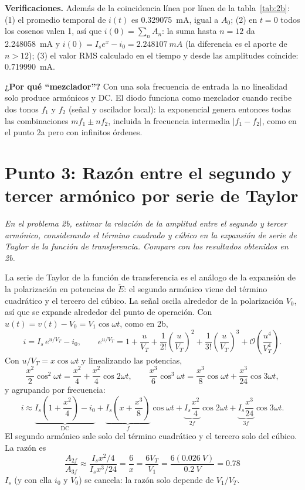 \documentclass{article}
\newcommand{\VT}{V_T}
\begin{document}
\textbf{Verificaciones.} Además de la coincidencia línea por línea de la tabla~\ref{tab:2b}:
(1) el promedio temporal de $i(t)$ es \SI{0.329075}{mA}, igual a $A_0$; (2) en $t=0$ todos los
cosenos valen 1, así que $i(0)=\sum_nA_n$: la suma hasta $n=12$ da \SI{2.248058}{mA} y
$i(0)=I_se^x-i_0=\SI{2.248107}{mA}$ (la diferencia es el aporte de $n>12$); (3) el valor RMS calculado
en el tiempo y desde las amplitudes coincide: \SI{0.719990}{mA}.

\textbf{¿Por qué ``mezclador''?} Con una sola frecuencia de entrada la no linealidad solo produce
armónicos y DC. El diodo funciona como mezclador cuando recibe dos tonos $f_1$ y $f_2$ (señal y
oscilador local): la exponencial genera entonces todas las combinaciones $mf_1\pm nf_2$, incluida la
frecuencia intermedia $|f_1-f_2|$, como en el punto 2a pero con infinitos órdenes.

\newpage
\section{Punto 3: Razón entre el segundo y tercer armónico por serie de Taylor}

\emph{En el problema 2b, estimar la relación de la amplitud entre el segundo y tercer armónico,
considerando el término cuadrado y cúbico en la expansión de serie de Taylor de la función de
transferencia. Compare con los resultados obtenidos en 2b.}

\bigskip

La serie de Taylor de la función de transferencia es el análogo de la expansión de la polarización
en potencias de $\tilde E$: el segundo armónico viene del término cuadrático y el tercero del cúbico.
La señal oscila alrededor de la polarización $V_0$, así que se expande alrededor del punto de
operación. Con $u(t)=v(t)-V_0=V_1\cos\omega t$, como en 2b,
\[
i=I_s\,e^{u/\VT}-i_0,\qquad
e^{u/\VT}=1+\frac{u}{\VT}+\frac{1}{2!}\left(\frac{u}{\VT}\right)^2+\frac{1}{3!}\left(\frac{u}{\VT}\right)^3
+\mathcal O\!\left(\frac{u^4}{\VT^4}\right).
\]
Con $u/\VT=x\cos\omega t$ y linealizando las potencias,
\[
\frac{x^2}{2}\cos^2\omega t=\frac{x^2}{4}+\frac{x^2}{4}\cos2\omega t,\qquad
\frac{x^3}{6}\cos^3\omega t=\frac{x^3}{8}\cos\omega t+\frac{x^3}{24}\cos3\omega t,
\]
y agrupando por frecuencia:
\[
i\approx\underbrace{I_s\left(1+\frac{x^2}{4}\right)-i_0}_{\text{DC}}
+\underbrace{I_s\left(x+\frac{x^3}{8}\right)}_{f}\cos\omega t
+\underbrace{I_s\frac{x^2}{4}}_{2f}\cos2\omega t
+\underbrace{I_s\frac{x^3}{24}}_{3f}\cos3\omega t .
\]
El segundo armónico sale solo del término cuadrático y el tercero solo del cúbico. La razón es
\[
\boxed{\;\frac{A_{2f}}{A_{3f}}\approx\frac{I_sx^2/4}{I_sx^3/24}=\frac6x=\frac{6\VT}{V_1}
=\frac{6(\SI{0.026}{V})}{\SI{0.2}{V}}=0.78\;}
\]
$I_s$ (y con ella $i_0$ y $V_0$) se cancela: la razón solo depende de $V_1/\VT$.
\end{document}
